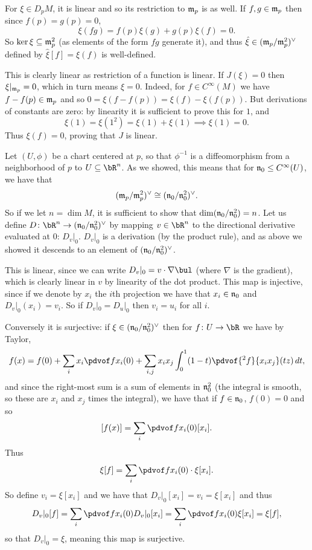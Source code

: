     \item For $\xi\in D_pM$, it is linear and so its restriction to ${\frak m}_p$ is as well.
    If $f,g\in{\frak m}_p$ then since $f(p)=g(p)=0$,
    $$ \xi(fg) = f(p)\xi(g) + g(p)\xi(f) = 0 . $$
    So $\ker\xi\subseteq{\frak m}_p^2$ (as elements of the form $fg$ generate it), and thus $\hat\xi\in({\frak m}_p/{\frak m}_p^2)^\vee$ defined
    by $\hat\xi[f]=\xi(f)$ is well-defined.

    \item This is clearly linear as restriction of a function is linear.
    If $J(\xi)=0$ then $\xi|_{{\frak m}_p}=0$, which in turn means $\xi=0$.
    Indeed, for $f\in C^\infty(M)$ we have $f-f(p)\in{\frak m}_p$ and so $0=\xi(f-f(p))=\xi(f)-\xi(f(p))$.
    But derivations of constants are zero: by linearity it is sufficient to prove this for $1$, and
    $$ \xi(1) = \xi(1^2) = \xi(1) + \xi(1) \implies \xi(1) = 0 . $$
    Thus $\xi(f)=0$, proving that $J$ is linear.

    \item Let $(U,\phi)$ be a chart centered at $p$, so that $\phi^{-1}$ is a diffeomorphism from a neighborhood of $p$
    to $U\subseteq\bR^n$.
    As we showed, this means that for ${\frak n}_0\leq C^\infty(U)$, we have that
    $$ ({\frak m}_p/{\frak m}_p^2)^\vee \cong ({\frak n}_0/{\frak n}_0^2)^\vee . $$
    So if we let $n=\dim M$, it is sufficient to show that $\dim({\frak n}_0/{\frak n}_0^2)=n$.
    Let us define $D\colon\bR^n\to(\n_0/\n_0^2)^\vee$ by mapping $v\in\bR^n$ to the directional derivative evaluated at $0$:
    $D_v|_0$.
    $D_v|_0$ is a derivation (by the product rule), and as above we showed it descends to an element of $({\frak n}_0/{\frak n}_0^2)^\vee$.

    This is linear, since we can write $D_v|_0=v\cdot\nabla\bul$ (where $\nabla$ is the gradient), which is clearly linear
    in $v$ by linearity of the dot product.
    This map is injective, since if we denote by $x_i$ the $i$th projection we have that $x_i\in{\frak n}_0$ and $D_v|_0(x_i)=v_i$.
    So if $D_v|_0=D_u|_0$ then $v_i=u_i$ for all $i$.

    Conversely it is surjective: if $\xi\in({\frak n}_0/{\frak n}_0^2)^\vee$ then for $f\colon U\to\bR$ we have by Taylor,
    $$ f(x) = f(0) + \sum_i x_i\pdvof f{x_i}(0) + \sum_{i,j}x_ix_j\int_0^1(1-t)\pdvof{^2f}{x_ix_j}(tz)\,dt , $$
    and since the right-most sum is a sum of elements in ${\frak n}_0^2$ (the integral is smooth, so these are $x_i$ and
    $x_j$ times the integral), we have that if $f\in{\frak n}_0$, $f(0)=0$ and so
    $$ [f(x)] = \sum_i\pdvof f{x_i}(0)[x_i] . $$
    Thus
    $$ \xi[f] = \sum_i\pdvof f{x_i}(0)\cdot\xi[x_i] . $$
    So define $v_i=\xi[x_i]$ and we have that $D_v|_0[x_i]=v_i=\xi[x_i]$ and thus
    $$ D_v|_0[f] = \sum_i\pdvof f{x_i}(0)D_v|_0[x_i] = \sum_i\pdvof f{x_i}(0)\xi[x_i] = \xi[f] , $$
    so that $D_v|_0=\xi$, meaning this map is surjective.

